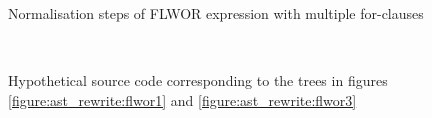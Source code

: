 \begin{figure}[!h]
{{			\label{figure:ast_rewrite:flwor2}
		}
		\quad
	}
	\caption{Normalisation steps of FLWOR expression with multiple for-clauses}
\end{figure}

\begin{figure}[!h]
	\centering
	\mbox{
		\quad
	}
	\caption{Hypothetical source code corresponding to the trees in figures
		\ref{figure:ast_rewrite:flwor1} and \ref{figure:ast_rewrite:flwor3}}
	\label{figure:ast_rewrite:flwor_src}
\end{figure}



